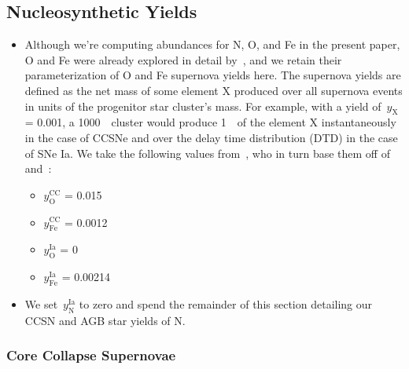\documentclass[ms.tex]{subfiles}
\begin{document}
\subsection{Nucleosynthetic Yields} 
\label{sec:methods:yields} 

\begin{itemize} 
	\item Although we're computing abundances for N, O, and Fe in the present 
	paper, O and Fe were already explored in detail by~\citet{Johnson2021}, and 
	we retain their parameterization of O and Fe supernova yields here. 
	The supernova yields are defined as the net mass of some element X produced 
	over all supernova events in units of the progenitor star cluster's mass. 
	For example, with a yield of~$y_\text{X}$ = 0.001, a 1000~\msun~cluster 
	would produce 1~\msun~of the element X instantaneously in the case of 
	CCSNe and over the delay time distribution (DTD) in the case of SNe Ia. 
	We take the following values from~\citet{Johnson2021}, who in turn base 
	them off of~\citet{Weinberg2017} and~\citet{Johnson2020}: 
	\begin{itemize} 
		\item $y_\text{O}^\text{CC}$ = 0.015 

		\item $y_\text{Fe}^\text{CC}$ = 0.0012 

		\item $y_\text{O}^\text{Ia}$ = 0 

		\item $y_\text{Fe}^\text{Ia}$ = 0.00214 
	\end{itemize} 

	\item We set~$y_\text{N}^\text{Ia}$ to zero and spend the remainder of this 
	section detailing our CCSN and AGB star yields of N. 
\end{itemize} 

\subsubsection{Core Collapse Supernovae} 
\label{sec:methods:yields:ccsn} 
\end{document}
